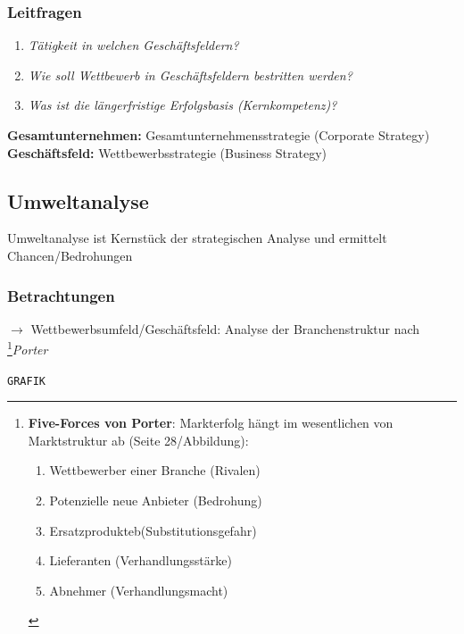\documentclass[a4paper,11pt, twoside]{article}
\begin{document}
\subsubsection*{Leitfragen}
\begin{enumerate}
	\item \textit{Tätigkeit in welchen Geschäftsfeldern?}
	\item \textit{Wie soll Wettbewerb in Geschäftsfeldern bestritten werden?}
	\item \textit{Was ist die längerfristige Erfolgsbasis (Kernkompetenz)?}
\end{enumerate}

\textbf{Gesamtunternehmen:} Gesamtunternehmensstrategie (Corporate Strategy)\\
\textbf{Geschäftsfeld:} Wettbewerbsstrategie (Business Strategy)

\subsection{Umweltanalyse}

Umweltanalyse ist Kernstück der strategischen Analyse und ermittelt Chancen/Bedrohungen

\subsubsection*{Betrachtungen}
$\rightarrow$ Wettbewerbsumfeld/Geschäftsfeld: Analyse der Branchenstruktur nach \footnote{
\textbf{Five-Forces von Porter}: Markterfolg hängt im wesentlichen von Marktstruktur ab (Seite 28/Abbildung):
\begin{enumerate}
	\item Wettbewerber einer Branche (Rivalen)
	\item Potenzielle neue Anbieter (Bedrohung)
	\item Ersatzprodukteb(Substitutionsgefahr)
	\item Lieferanten (Verhandlungsstärke)
	\item Abnehmer (Verhandlungsmacht)
\end{enumerate}
}{\textit{Porter}}

\texttt{GRAFIK}
\end{document}
